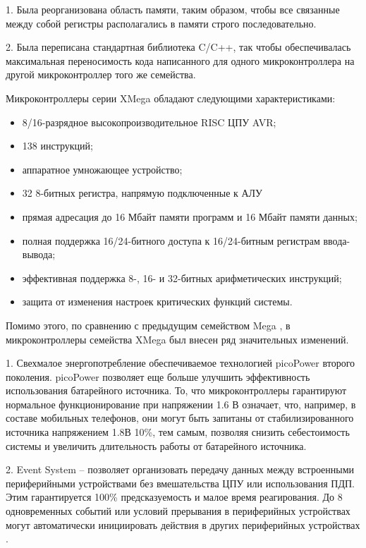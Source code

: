 \begin{par}
    1. Была реорганизована область памяти, таким образом, чтобы все связанные между
            собой регистры располагались в памяти строго последовательно.
\end{par}
\begin{par}
    2. Была переписана стандартная библиотека C/C++, так чтобы обеспечивалась
            максимальная переносимость кода написанного для одного микроконтроллера
            на другой микроконтроллер того же семейства.
\end{par}

Микроконтроллеры серии XMega обладают следующими характеристиками:
\begin{itemize}
	\item{} 8/16-разрядное высокопроизводительное RISC ЦПУ AVR;
	\item{} 138 инструкций;
	\item{} аппаратное умножающее устройство;
	\item{} 32 8-битных регистра, напрямую подключенные к АЛУ
	\item{} прямая адресация до 16 Мбайт памяти программ и 16 Мбайт памяти данных;
	\item{} полная поддержка 16/24-битного доступа к 16/24-битным регистрам ввода-вывода;
	\item{} эффективная поддержка 8-, 16- и 32-битных арифметических инструкций;
	\item{} защита от изменения настроек критических функций системы.
\end{itemize}

Помимо этого, по сравнению с предыдущим семейством Mega \cite{avrref}, в микроконтроллеры семейства
XMega был внесен ряд значительных изменений.

\begin{par}
    1. Свехмалое энергопотребление обеспечиваемое технологией picoPower второго поколения.
    picoPower позволяет еще больше улучшить эффективность использования батарейного источника.
    То, что микроконтроллеры гарантируют нормальное функционирование при напряжении 1.6 В означает,
    что, например, в составе мобильных телефонов, они могут быть запитаны от стабилизированного
    источника напряжением 1.8В 10\%, тем самым, позволяя снизить себестоимость системы и увеличить
    длительность работы от батарейного источника. 
\end{par}

\begin{par}
    2. Event System -- позволяет организовать передачу данных между встроенными периферийными
    устройствами без вмешательства ЦПУ или использования ПДП.
    Этим гарантируется 100\% предсказуемость и малое время реагирования.
    До 8 одновременных событий или условий прерывания в периферийных устройствах могут автоматически
    инициировать действия в других периферийных устройствах \cite{avrxm}.
\end{par}

